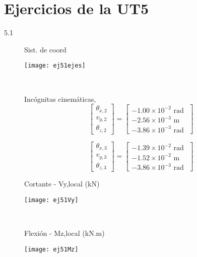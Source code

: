 \section{Ejercicios de la UT5}

\begin{description}

\item[5.1]

\begin{minipage}{0.45\textwidth}
	Sist. de coord
	
	\texttt{[image: ej51ejes]}
\end{minipage}
~
\begin{minipage}{0.45\textwidth}
Incógnitas cinemáticas,
$$
\left[
\begin{matrix}
\theta_{x,2} \\
v_{y,2} \\
\theta_{z,2}
\end{matrix}
\right]
=
\left[
\begin{matrix}
-1.00\times 10^{-2} \text{ rad }\\
-2.56\times 10^{-3} \text{ m }\\
-3.86\times 10^{-3} \text{ rad }
\end{matrix}
\right]
$$

$$
\left[
\begin{matrix}
\theta_{x,3} \\
v_{y,3} \\
\theta_{z,3}
\end{matrix}
\right]
=
\left[
\begin{matrix}
-1.39\times 10^{-2} \text{ rad }\\
-1.52\times 10^{-2} \text{ m }\\
-3.86\times 10^{-3} \text{ rad }
\end{matrix}
\right]
$$
\end{minipage}

\vspace{5mm}

\begin{minipage}{0.45\textwidth}
Cortante - Vy,local (kN)

\texttt{[image: ej51Vy]}
\end{minipage}
~
\begin{minipage}{0.45\textwidth}
Flexión - Mz,local (kN.m)

\texttt{[image: ej51Mz]}
\end{minipage}



\end{description}
